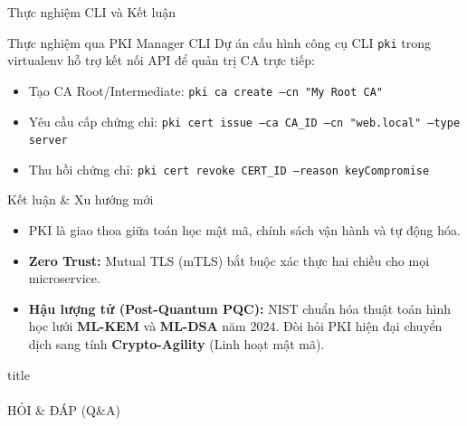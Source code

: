 \documentclass[10pt, aspectratio=169]{beamer}
\begin{document}
\begin{frame}{Thực nghiệm CLI và Kết luận}
    \begin{block}{Thực nghiệm qua PKI Manager CLI}
        Dự án cấu hình công cụ CLI \texttt{pki} trong virtualenv hỗ trợ kết nối API để quản trị CA trực tiếp:
        \begin{itemize}
            \item Tạo CA Root/Intermediate: \texttt{pki ca create --cn "My Root CA"}
            \item Yêu cầu cấp chứng chỉ: \texttt{pki cert issue --ca CA\_ID --cn "web.local" --type server}
            \item Thu hồi chứng chỉ: \texttt{pki cert revoke CERT\_ID --reason keyCompromise}
        \end{itemize}
    \end{block}
    \begin{block}{Kết luận \& Xu hướng mới}
        \begin{itemize}
            \item PKI là giao thoa giữa toán học mật mã, chính sách vận hành và tự động hóa.
            \item \textbf{Zero Trust:} Mutual TLS (mTLS) bắt buộc xác thực hai chiều cho mọi microservice.
            \item \textbf{Hậu lượng tử (Post-Quantum PQC):} NIST chuẩn hóa thuật toán hình học lưới \textbf{ML-KEM} và \textbf{ML-DSA} năm 2024. Đòi hỏi PKI hiện đại chuyển dịch sang tính \textbf{Crypto-Agility} (Linh hoạt mật mã).
        \end{itemize}
    \end{block}
\end{frame}

\begin{frame}[plain]
    \vfill
    \centering
    \begin{beamercolorbox}[sep=12pt,center,shadow=true,rounded=true]{title}
        \\[0.4cm]
        \\
        \vspace{0.4cm}
        \large HỎI \& ĐÁP (Q\&A)
    \end{beamercolorbox}
    \vfill
\end{frame}
\end{document}
